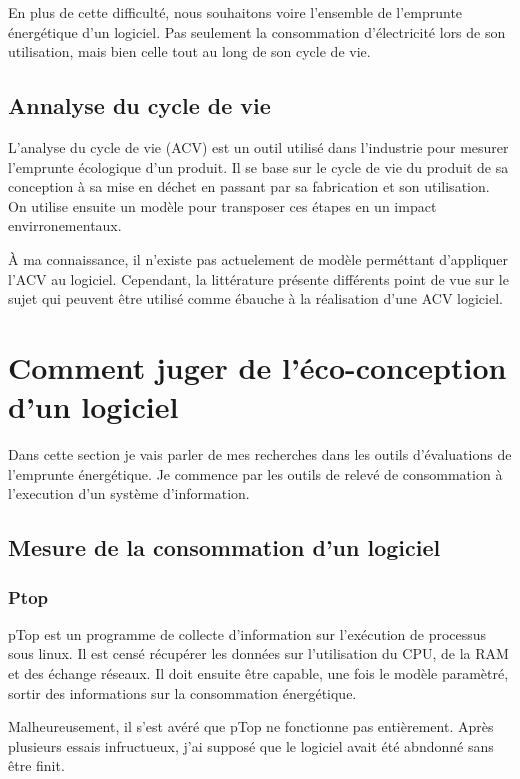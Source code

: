 \documentclass[a4paper, 11pt]{report}
\begin{document}
En plus de cette difficulté, nous souhaitons voire l'ensemble de l'emprunte énergétique d'un logiciel. Pas seulement la consommation d'électricité lors de son utilisation, mais bien celle tout au long de son cycle de vie.

\subsection{Annalyse du cycle de vie}
L'analyse du cycle de vie (ACV) est un outil utilisé dans l'industrie pour mesurer l'emprunte écologique d'un produit. Il se base sur le cycle de vie du produit de sa conception à sa mise en déchet en passant par sa fabrication et son utilisation. On utilise ensuite un modèle pour transposer ces étapes en un impact envirronementaux.

À ma connaissance, il n'existe pas actuelement de modèle perméttant d'appliquer l'ACV au logiciel. Cependant, la littérature présente différents point de vue sur le sujet qui peuvent être utilisé comme ébauche à la réalisation d'une ACV logiciel.

\section{Comment juger de l'éco-conception d'un logiciel}
Dans cette section je vais parler de mes recherches dans les outils d'évaluations de l'emprunte énergétique. Je commence par les outils de relevé de consommation à l'execution d'un système d'information.

\subsection{Mesure de la consommation d'un logiciel}
\subsubsection{Ptop}
pTop est un programme de collecte d’information sur l'exécution de processus sous linux. Il est censé récupérer les données sur l'utilisation du CPU, de la RAM et des échange réseaux. Il doit ensuite être capable, une fois le modèle paramètré, sortir des informations sur la consommation énergétique.

Malheureusement, il s'est avéré que pTop ne fonctionne pas entièrement. Après plusieurs essais infructueux, j'ai supposé que le logiciel avait été abndonné sans être finit.
\end{document}
